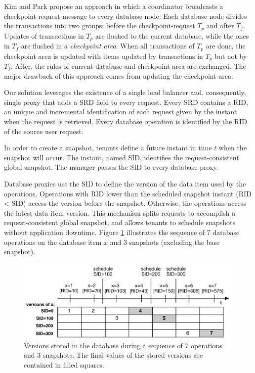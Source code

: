 Kim and Park \cite{kim_checkpoint} propose an approach in which a coordinator broadcasts a checkpoint-request message to every database node. Each database node divides the transactions into two groups: before the checkpoint-request $T_p$ and after $T_f$. Updates of transactions in $T_p$ are flushed to the current database, while the ones in $T_f$ are flushed in a \emph{checkpoint area}. When all transactions of $T_p$ are done, the checkpoint area is updated with items updated by transactions in $T_p$ but not by $T_f$. After, the rules of current database and checkpoint area are exchanged. The major drawback of this approach comes from updating the checkpoint area.


Our solution leverages the existence of a single load balancer and, consequently, single proxy that adds a \acf{SRD} field to every request. Every \ac{SRD} contains a \ac{RID}, an unique and incremental identification of each request given by the instant when the request is retrieved. Every database operation is identified by the \ac{RID} of the source user request.

In order to create a snapshot, tenants define a future instant in time $t$ when the snapshot will occur. The instant, named \acf{SID}, identifies the request-consistent global snapshot. The manager passes the \ac{SID} to every database proxy.

Database proxies use the \ac{SID} to define the version of the data item used by the operations. Operations with \acf{RID} lower than the scheduled snapshot instant (\ac{RID} < \ac{SID}) access the version before the snapshot. Otherwise, the operations access the latest data item version. This mechanism splits requests to accomplish a request-consistent global snapshot, and allows tenants to schedule snapshots without application downtime. Figure \ref{fig:snapshots} illustrates the sequence of 7 database operations on the database item $x$ and 3 snapshots (excluding the base snapshot).

\begin{figure}
\centering
  \includegraphics[width=130mm]{images/snapshots}
  \caption[Snapshot versions stored in the database]{Versions stored in the database during a sequence of 7 operations and 3 snapshots. The final values of the stored versions are contained in filled squares.}
\label{fig:snapshots}
\end{figure}

